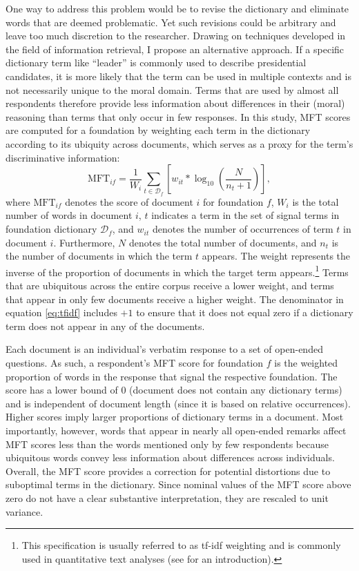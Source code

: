 \documentclass[12pt]{article}
\begin{document}
One way to address this problem would be to revise the dictionary and eliminate words that are deemed problematic. Yet such revisions could be arbitrary and leave too much discretion to the researcher. Drawing on techniques developed in the field of information retrieval, I propose an alternative approach. If a specific dictionary term like ``leader'' is commonly used to describe presidential candidates, it is more likely that the term can be used in multiple contexts and is not necessarily unique to the moral domain. Terms that are used by almost all respondents therefore provide less information about differences in their (moral) reasoning than terms that only occur in few responses. In this study, MFT scores are computed for a foundation by weighting each term in the dictionary according to its ubiquity across documents, which serves as a proxy for the term's discriminative information:
\begin{equation}\label{eq:tfidf}
\text{MFT}_{if} = \dfrac{1}{W_i} \sum_{t \in \mathcal{D}_f} \left[ w_{it} * \log_{10}\left( \dfrac{N}{n_t+1}\right) \right],
\end{equation}
where $\text{MFT}_{if}$ denotes the score of document $i$ for foundation $f$, $W_i$ is the total number of words in document $i$, $t$ indicates a term in the set of signal terms in foundation dictionary $\mathcal{D}_f$, and $w_{it}$ denotes the number of occurrences of term $t$ in document $i$. Furthermore, $N$ denotes the total number of documents, and $n_t$ is the number of documents in which the term $t$ appears. The weight represents the inverse of the proportion of documents in which the target term appears.\footnote{This specification is usually referred to as tf-idf weighting and is commonly used in quantitative text analyses (see \citealt[ch. 6]{manning2008introduction} for an introduction).} Terms that are ubiquitous across the entire corpus receive a lower weight, and terms that appear in only few documents receive a higher weight. The denominator in equation \eqref{eq:tfidf} includes $+1$ to ensure that it does not equal zero if a dictionary term does not appear in any of the documents.

Each document is an individual's verbatim response to a set of open-ended questions. As such, a respondent's MFT score for foundation $f$ is the weighted proportion of words in the response that signal the respective foundation. The score has a lower bound of 0 (document does not contain any dictionary terms) and is independent of document length (since it is based on relative occurrences). Higher scores imply larger proportions of dictionary terms in a document. Most importantly, however, words that appear in nearly all open-ended remarks affect MFT scores less than the words mentioned only by few respondents because ubiquitous words convey less information about differences across individuals. Overall, the MFT score provides a correction for potential distortions due to suboptimal terms in the dictionary. Since nominal values of the MFT score above zero do not have a clear substantive interpretation, they are rescaled to unit variance.
\end{document}
